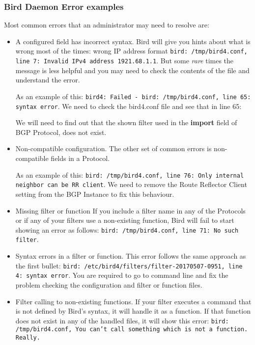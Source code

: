 \subsubsection{Bird Daemon Error examples}
Most common errors that an administrator may need to resolve are:

\begin{itemize}
\item A configured field has incorrect syntax.
Bird will give you hints about what is wrong most of the times: wrong IP address format \texttt{bird: /tmp/bird4.conf, line 7: Invalid IPv4 address 1921.68.1.1}. But some \textit{rare} times the message is less helpful and you may need to check the contents of the file and understand the error.

As an example of this: \texttt{bird4: Failed - bird: /tmp/bird4.conf, line 65: syntax error}. We need to check the bird4.conf file and see that in line 65:



We will need to find out that the shown filter used in the \textbf{import} field of BGP Protocol, does not exist.

\item Non-compatible configuration.
The other set of common errors is non-compatible fields in a Protocol.

As an example of this: \texttt{bird: /tmp/bird4.conf, line 76: Only internal neighbor can be RR client}. We need to remove the Route Reflector Client setting from the BGP Instance to fix this behaviour.

\item Missing filter or function
If you include a filter name in any of the Protocols or if any of your filters use a non-existing function, Bird will fail to start showing an error as follows: \texttt{bird: /tmp/bird4.conf, line 71: No such filter}.

\item Syntax errors in a filter or function.
This error follows the same approach as the first bullet: \texttt{bird: /etc/bird4/filters/filter-20170507-0951, line 4: syntax error}. You are required to go to command line and fix the problem checking the configuration and filter or function files.

\item Filter calling to non-existing functions.
If your filter executes a command that is not defined by Bird's syntax, it will handle it as a function. If that function does not exist in any of the handled files, it will show this error: \texttt{bird: /tmp/bird4.conf, You can't call something which is not a function. Really.}


\end{itemize}
